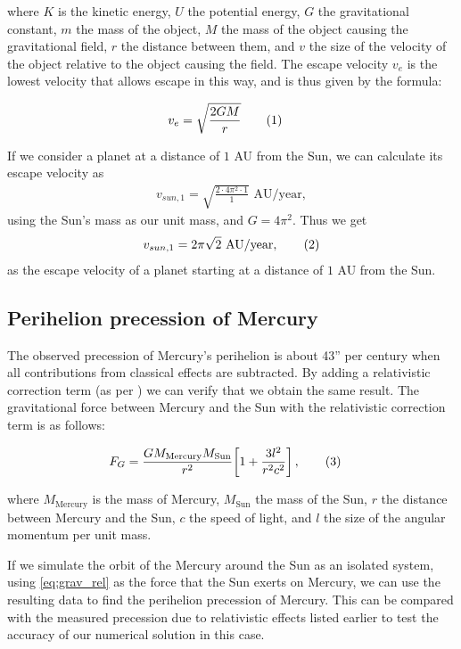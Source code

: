 \documentclass[reprint,english,notitlepage]{revtex4-1}  %
\newcommand\numberthis{\addtocounter{equation}{1}\tag{\theequation}}
\begin{document}
where $K$ is the kinetic energy, $U$ the potential energy, $G$ the gravitational constant, $m$ the mass of the object, $M$ the mass of the object causing the gravitational field, $r$ the distance between them, and $v$ the size of the velocity of the object relative to the object causing the field. The escape velocity $v_e$ is the lowest velocity that allows escape in this way, and is thus given by the formula:

\begin{align*}
v_e &= \sqrt{\frac{2GM}{r}} \numberthis \label{eq:esc_vel}
\end{align*}

If we consider a planet at a distance of \(1\) AU from the Sun, we can calculate its escape velocity as
\begin{align*}
	v_{sun, 1} = \sqrt{\frac{2\cdot 4\pi^{2}\cdot 1}{1}} \text{ AU/year},
\end{align*}
using the Sun's mass as our unit mass, and \(G = 4\pi^{2}\). Thus we get
\begin{align*}
	v_{sun, 1} = 2\pi\sqrt{2}\text{ AU/year}, \numberthis \label{eq:esc_sun_1au}
\end{align*}
as the escape velocity of a planet starting at a distance of \(1\) AU from the Sun.

\subsection{Perihelion precession of Mercury} \label{sec:II:f}

The observed precession of Mercury's perihelion is about 43'' per century when all contributions from classical effects are subtracted. By adding a relativistic correction term (as per \citep[p.~5]{Hjorth-Jensen2020}) we can verify that we obtain the same result. The gravitational force between Mercury and the Sun with the relativistic correction term is as follows:

\begin{align*}
F_G &= \frac{GM_\text{Mercury} M_\text{Sun}}{r^2} \bigg[ 1 + \frac{3l^2}{r^2 c^2}\bigg] \, , \numberthis \label{eq:grav_rel}
\end{align*}

where $M_\text{Mercury}$ is the mass of Mercury, $M_\text{Sun}$ the mass of the Sun, $r$ the distance between Mercury and the Sun, $c$ the speed of light, and $l$ the size of the angular momentum per unit mass.

If we simulate the orbit of the Mercury around the Sun as an isolated system, using \eqref{eq:grav_rel} as the force that the Sun exerts on Mercury, we can use the resulting data to find the perihelion precession of Mercury. This can be compared with the measured precession due to relativistic effects listed earlier to test the accuracy of our numerical solution in this case.
\end{document}
